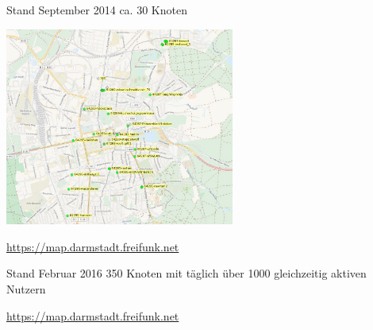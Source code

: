 \documentclass[10pt]{beamer}
\begin{document}
    \begin{frame}{Stand September 2014}
      ca. 30 Knoten
      \begin{center}
        \vfill
        \begin{center}
          \includegraphics[height=6.5cm]{images/darmstadt-map}
        \end{center}
        \vfill
        \url{https://map.darmstadt.freifunk.net}
      \end{center}
    \end{frame}

    \begin{frame}{Stand Februar 2016}
      350 Knoten mit täglich über 1000 gleichzeitig aktiven Nutzern
      \begin{center}
        \vfill
        \begin{center}
        \end{center}
        \vfill
        \url{https://map.darmstadt.freifunk.net}
      \end{center}
    \end{frame}
\end{document}
